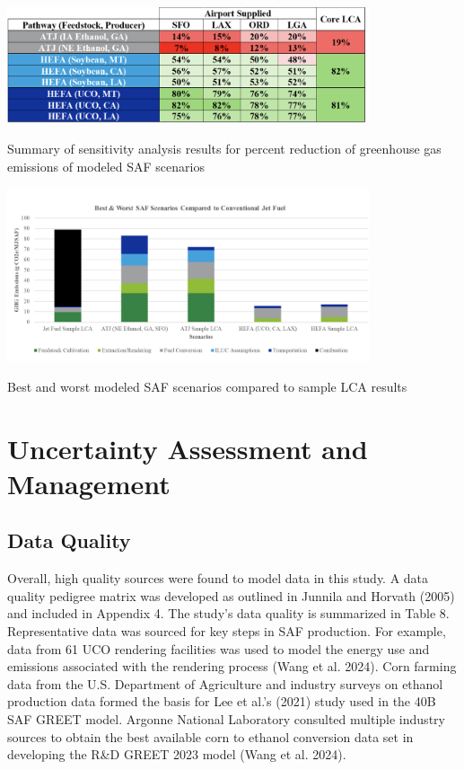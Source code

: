 \documentclass[12pt]{article}
\begin{document}
\begin{table}[H]
\centering
\includegraphics[width=0.8\textwidth]{Figures/perc.png} %
\caption{Summary of sensitivity analysis results for percent reduction of greenhouse gas emissions of modeled SAF scenarios}
\label{table:perc}
\end{table}

\begin{table}[H]
\centering
\includegraphics[width=0.8\textwidth]{Figures/bestworst.png} %
\caption{Best and worst modeled SAF scenarios compared to sample LCA results}
\label{table:perc}
\end{table}

\section{Uncertainty Assessment and Management}

\subsection{Data Quality}

Overall, high quality sources were found to model data in this study. A data quality pedigree matrix was developed as outlined in Junnila and Horvath (2005) and included in Appendix 4. The study’s data quality is summarized in Table 8. Representative data was sourced for key steps in SAF production. For example, data from 61 UCO rendering facilities was used to model the energy use and emissions associated with the rendering process (Wang et al. 2024). Corn farming data from the U.S. Department of Agriculture and industry surveys on ethanol production data formed the basis for Lee et al.’s (2021) study used in the 40B SAF GREET model. Argonne National Laboratory consulted multiple industry sources to obtain the best available corn to ethanol conversion data set in developing the R\&D GREET 2023 model (Wang et al. 2024). 
\end{document}
